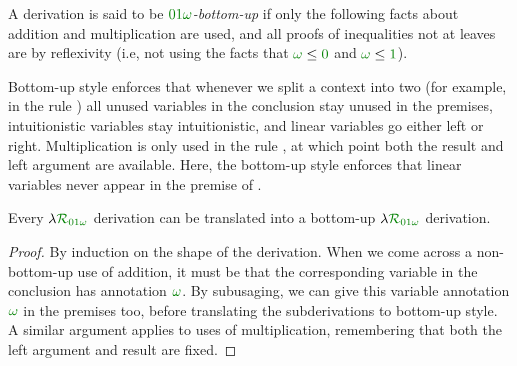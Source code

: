 \begin{definition}\label{def:DILL-bottom-up}
  A derivation is said to be \emph{$\instDILL$-bottom-up} if only the following
  facts about addition and multiplication are used, and all proofs of
  inequalities not at leaves are by reflexivity (i.e, not using the facts that
  $\gr\omega \leq \gr0$ and $\gr\omega \leq \gr1$).

\end{definition}

Bottom-up style enforces that whenever we split a context into two (for
example, in the rule ) all unused variables in the
conclusion stay unused in the premises, intuitionistic variables stay
intuitionistic, and linear variables go either left or right.
Multiplication is only used in the rule , at which point
both the result and left argument are available.
Here, the bottom-up style enforces that linear variables never appear in the
premise of .

\begin{lemma}
  Every $\name_{\instDILL}$ derivation can be translated into a bottom-up
  $\name_{\instDILL}$ derivation.
\end{lemma}
\begin{proof}
  By induction on the shape of the derivation.
  When we come across a non-bottom-up use of addition, it must be that the
  corresponding variable in the conclusion has annotation $\gr\omega$.
  By subusaging, we can give this variable annotation $\gr\omega$ in
  the premises too, before translating the subderivations to bottom-up
  style.
  A similar argument applies to uses of multiplication, remembering that both
  the left argument and result are fixed.
\end{proof}

